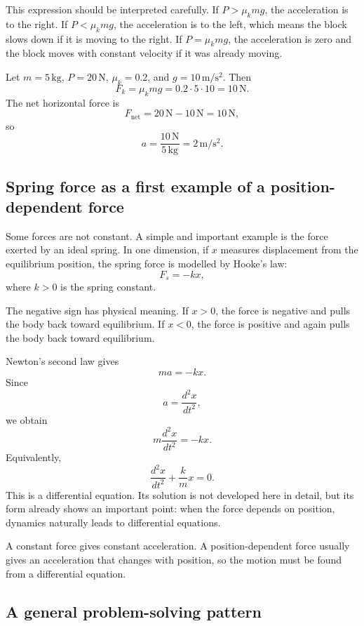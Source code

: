 This expression should be interpreted carefully. If \(P>\mu_k mg\), the acceleration is to the right. If \(P<\mu_k mg\), the acceleration is to the left, which means the block slows down if it is moving to the right. If \(P=\mu_k mg\), the acceleration is zero and the block moves with constant velocity if it was already moving.

\begin{examplebox}
Let \(m=5\,\mathrm{kg}\), \(P=20\,\mathrm{N}\), \(\mu_k=0.2\), and \(g=10\,\mathrm{m/s^2}\). Then
\[
F_k=\mu_k mg=0.2\cdot 5\cdot 10=10\,\mathrm{N}.
\]
The net horizontal force is
\[
F_{\mathrm{net}}=20\,\mathrm{N}-10\,\mathrm{N}=10\,\mathrm{N},
\]
so
\[
a=\frac{10\,\mathrm{N}}{5\,\mathrm{kg}}=2\,\mathrm{m/s^2}.
\]
\end{examplebox}

\subsection{Spring force as a first example of a position-dependent force}

Some forces are not constant. A simple and important example is the force exerted by an ideal spring. In one dimension, if \(x\) measures displacement from the equilibrium position, the spring force is modelled by Hooke's law:
\[
F_s=-kx,
\]
where \(k>0\) is the spring constant.

The negative sign has physical meaning. If \(x>0\), the force is negative and pulls the body back toward equilibrium. If \(x<0\), the force is positive and again pulls the body back toward equilibrium.

Newton's second law gives
\[
ma=-kx.
\]
Since
\[
a=\frac{d^2x}{dt^2},
\]
we obtain
\[
m\frac{d^2x}{dt^2}=-kx.
\]
Equivalently,
\[
\frac{d^2x}{dt^2}+\frac{k}{m}x=0.
\]
This is a differential equation. Its solution is not developed here in detail, but its form already shows an important point: when the force depends on position, dynamics naturally leads to differential equations.

\begin{remarkbox}
A constant force gives constant acceleration. A position-dependent force usually gives an acceleration that changes with position, so the motion must be found from a differential equation.
\end{remarkbox}

\subsection{A general problem-solving pattern}

